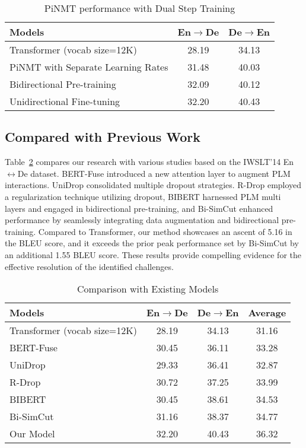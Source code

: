 \documentclass[conference]{IEEEtran}
\begin{document}
\begin{table}[!tb]
    \centering
    \caption{PiNMT performance with Dual Step Training}
    \label{tab:7}
    \begin{tabular}{|l|c|c|}
        \hline
        \textbf{Models} & \textbf{En$\rightarrow$De} & \textbf{De$\rightarrow$En} \\
        \hline
        Transformer (vocab size=12K) & 28.19 & 34.13 \\
        \hline
        PiNMT with Separate Learning Rates & 31.48 & 40.03 \\
        Bidirectional Pre-training & 32.09 & 40.12 \\
        Unidirectional Fine-tuning & 32.20 & 40.43 \\
        \hline
    \end{tabular}
\end{table}


\subsection{Compared with Previous Work}
Table~\ref{tab:8} compares our research with various studies based on the IWSLT'14 En$\leftrightarrow$De dataset. BERT-Fuse \cite{zhu2020incorporating} introduced a new attention layer to augment PLM interactions. UniDrop \cite{wu2021unidrop}  consolidated multiple dropout strategies. R-Drop \cite{wu2021r}  employed a regularization technique utilizing dropout, BIBERT \cite{xu2021bibert} harnessed PLM multi layers and engaged in bidirectional pre-training, and Bi-SimCut \cite{gao2022bi} enhanced performance by seamlessly integrating data augmentation and bidirectional pre-training. Compared to Transformer, our method showcases an ascent of 5.16 in the BLEU score, and it exceeds the prior peak performance set by Bi-SimCut by an additional 1.55 BLEU score. These results provide compelling evidence for the effective resolution of the identified challenges.

\begin{table}[!tb]
    \centering
    \caption{Comparison with Existing Models}
    \label{tab:8}
    \begin{tabular}{|l|c|c|c|}
        \hline
        \textbf{Models} & \textbf{En$\rightarrow$De} & \textbf{De$\rightarrow$En} & \textbf{Average} \\
        \hline
        Transformer (vocab size=12K) & 28.19 & 34.13 & 31.16 \\
        BERT-Fuse & 30.45 & 36.11 & 33.28 \\
        UniDrop & 29.33 & 36.41 & 32.87 \\
        R-Drop & 30.72 & 37.25 & 33.99 \\
        BIBERT & 30.45 & 38.61 & 34.53 \\
        Bi-SimCut & 31.16 & 38.37 & 34.77 \\
        \hline
        Our Model & 32.20 & 40.43 & 36.32 \\
        \hline
    \end{tabular}
\end{table}
\end{document}
